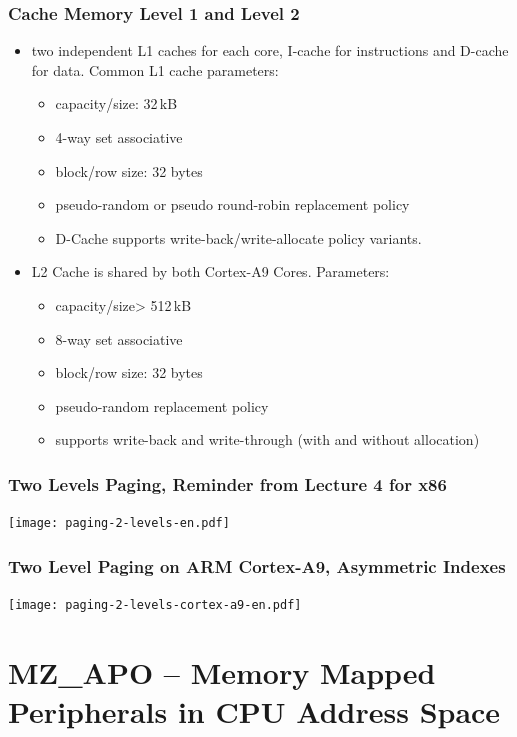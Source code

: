 \documentclass{beamer}
\begin{document}
\begin{frame}
\frametitle{Cache Memory Level 1 and Level 2}
\begin{itemize}
 \item two independent L1 caches for each core, I-cache for instructions and D-cache for data. Common L1 cache parameters:
 \begin{itemize}
  \item capacity/size: 32\,kB
  \item 4-way set associative
  \item block/row size: 32 bytes
  \item pseudo-random or pseudo round-robin replacement policy
  \item D-Cache supports write-back/write-allocate policy variants.
 \end{itemize}
 \item L2 Cache is shared by both Cortex-A9 Cores. Parameters:
 \begin{itemize}
   \item capacity/size> 512\,kB
   \item 8-way set associative
   \item block/row size: 32 bytes
   \item pseudo-random replacement policy
   \item supports write-back and write-through (with and without allocation)
 \end{itemize}
\end{itemize}

\end{frame}

\begin{frame}
\frametitle{Two Levels Paging, Reminder from Lecture 4 for x86}

\texttt{[image: paging-2-levels-en.pdf]}

\end{frame}

\begin{frame}
\frametitle{Two Level Paging on ARM Cortex-A9, Asymmetric Indexes}

\texttt{[image: paging-2-levels-cortex-a9-en.pdf]}

\end{frame}

\section{MZ\_APO -- Memory Mapped Peripherals in CPU Address Space}
\end{document}
